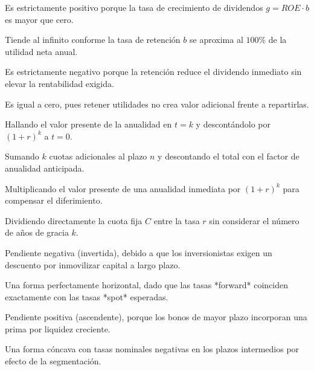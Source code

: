 \begin{opts}
    \item Es estrictamente positivo porque la tasa de crecimiento de dividendos $g = ROE \cdot b$ es mayor que cero.
    \item Tiende al infinito conforme la tasa de retención $b$ se aproxima al $100\%$ de la utilidad neta anual.
    \item Es estrictamente negativo porque la retención reduce el dividendo inmediato sin elevar la rentabilidad exigida.
    \item Es igual a cero, pues retener utilidades no crea valor adicional frente a repartirlas.
\end{opts}

\begin{opts}
    \item Hallando el valor presente de la anualidad en $t = k$ y descontándolo por $(1 + r)^k$ a $t = 0$.
    \item Sumando $k$ cuotas adicionales al plazo $n$ y descontando el total con el factor de anualidad anticipada.
    \item Multiplicando el valor presente de una anualidad inmediata por $(1 + r)^k$ para compensar el diferimiento.
    \item Dividiendo directamente la cuota fija $C$ entre la tasa $r$ sin considerar el número de años de gracia $k$.
\end{opts}

\begin{opts}
    \item Pendiente negativa (invertida), debido a que los inversionistas exigen un descuento por inmovilizar capital a largo plazo.
    \item Una forma perfectamente horizontal, dado que las tasas *forward* coinciden exactamente con las tasas *spot* esperadas.
    \item Pendiente positiva (ascendente), porque los bonos de mayor plazo incorporan una prima por liquidez creciente.
    \item Una forma cóncava con tasas nominales negativas en los plazos intermedios por efecto de la segmentación.
\end{opts}

